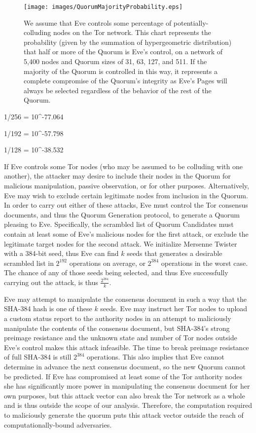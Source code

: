 \begin{figure}[htbp]
	\centering
	\texttt{[image: images/QuorumMajorityProbability.eps]}
	\caption{We assume that Eve controls some percentage of potentially-colluding nodes on the Tor network. This chart represents the probability (given by the summation of hypergeometric distribution) that half or more of the Quorum is Eve's control, on a network of 5,400 nodes and Quorum sizes of 31, 63, 127, and 511. If the majority of the Quorum is controlled in this way, it represents a complete compromise of the Quorum's integrity as Eve's Pages will always be selected regardless of the behavior of the rest of the Quorum.}
	\label{chart:quorumMajority}
\end{figure}

1/256 = 10^-77.064

1/192 = 10^-57.798

1/128 = 10^-38.532

If Eve controls some Tor nodes (who may be assumed to be colluding with one another), the attacker may desire to include their nodes in the Quorum for malicious manipulation, passive observation, or for other purposes. Alternatively, Eve may wish to exclude certain legitimate nodes from inclusion in the Quorum. In order to carry out either of these attacks, Eve must control the Tor consensus documents, and thus the Quorum Generation protocol, to generate a Quorum pleasing to Eve. Specifically, the scrambled list of Quorum Candidates must contain at least some of Eve's malicious nodes for the first attack, or exclude the legitimate target nodes for the second attack. We initialize Mersenne Twister with a 384-bit seed, thus Eve can find $ k $ seeds that generates a desirable scrambled list in $ 2^{192} $ operations on average, or $ 2^{384} $ operations in the worst case. The chance of any of those seeds being selected, and thus Eve successfully carrying out the attack, is thus $ \frac{2^{384}}{k} $.

Eve may attempt to manipulate the consensus document in such a way that the SHA-384 hash is one of these $ k $ seeds. Eve may instruct her Tor nodes to upload a custom status report to the authority nodes in an attempt to maliciously manipulate the contents of the consensus document, but SHA-384's strong preimage resistance and the unknown state and number of Tor nodes outside Eve's control makes this attack infeasible. The time to break preimage resistance of full SHA-384 is still $ 2^{384} $ operations. This also implies that Eve cannot determine in advance the next consensus document, so the new Quorum cannot be predicted. If Eve has compromised at least some of the Tor authority nodes she has significantly more power in manipulating the consensus document for her own purposes, but this attack vector can also break the Tor network as a whole and is thus outside the scope of our analysis. Therefore, the computation required to maliciously generate the quorum puts this attack vector outside the reach of computationally-bound adversaries.

